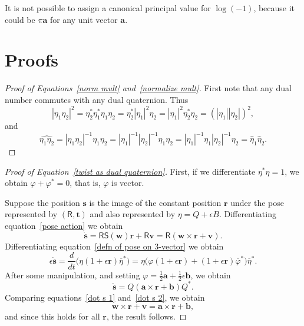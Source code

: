 \documentclass[reqno,12pt]{amsart}
\newcommand\starop[1]{\mathsf S(#1)}
\begin{document}
It is not possible to assign a canonical principal value for $\log(-1)$, because it could be $\pi \bm a$ for any unit vector $\bm a$.

\section{Proofs}
\label{sec proofs}

\begin{proof}[Proof of Equations~\eqref{norm mult} and~\eqref{normalize mult}]
First note that any dual number commutes with any dual quaternion.  Thus
\begin{equation}
|\eta_1 \eta_2|^2 = \eta_2^* \eta_1^* \eta_1 \eta_2 = \eta_2^* |\eta_1|^2 \eta_2 = |\eta_1|^2 \eta_2^* \eta_2 = (|\eta_1| |\eta_2|)^2 ,
\end{equation}
and
\begin{equation}
\widehat{\eta_1 \eta_2}
= |\eta_1 \eta_2|^{-1} \eta_1 \eta_2
= |\eta_1|^{-1} | \eta_2|^{-1} \eta_1 \eta_2
= |\eta_1|^{-1} \eta_1 | \eta_2|^{-1} \eta_2
= \widehat\eta_1 \widehat\eta_2.
\end{equation}

\end{proof}

\begin{proof}[Proof of Equation~\eqref{twist as dual quaternion}]
First, if we differentiate $\eta^* \eta = 1$, we obtain $\varphi + \varphi^* = 0$, that is, $\varphi$ is vector.

Suppose the position $\bm s$ is the image of the constant position $\bm r$ under the pose represented by $(\mathsf R, \bm t)$ and also represented by $\eta = Q + \epsilon B$.  Differentiating equation~\eqref{pose action} we obtain
\begin{equation}
\label{dot s 1}
\dot{\bm s} = \mathsf R \starop{\bm w} \bm r + \mathsf R \bm v = \mathsf R(\bm w \times \bm r + \bm v ).
\end{equation}
Differentiating equation~\eqref{defn of pose on 3-vector} we obtain
\begin{equation}
\epsilon \dot{\bm s}
= \frac d{dt}\bigl(\eta(1+\epsilon \bm r)\overline\eta^*\bigr)
= \eta\bigl(\varphi(1+\epsilon \bm r) + (1+\epsilon\bm r)\overline\varphi^*\bigr)\overline \eta^* .
\end{equation}
After some manipulation, and setting $\varphi = \tfrac12\bm a + \tfrac12\epsilon \bm b$, we obtain
\begin{equation}
\label{dot s 2}
\dot{\bm s} = Q(\bm a \times \bm r + \bm b)Q^* .
\end{equation}
Comparing equations~\eqref{dot s 1} and~\eqref{dot s 2}, we obtain
\begin{equation}
\bm w \times \bm r + \bm v = \bm a \times \bm r + \bm b,
\end{equation}
and since this holds for all $\bm r$, the result follows.
\end{proof}
\end{document}
